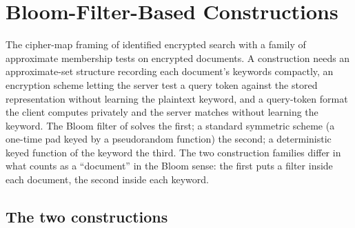 %

\section{Bloom-Filter-Based Constructions}
\label{sec:bloom-based}

The cipher-map framing of  identified
encrypted search with a family of approximate membership tests on
encrypted documents. A construction needs an approximate-set structure
recording each document's keywords compactly, an encryption scheme
letting the server test a query token against the stored representation
without learning the plaintext keyword, and a query-token format the
client computes privately and the server matches without learning the
keyword. The Bloom
filter of  solves the first; a standard symmetric
scheme (a one-time pad keyed by a pseudorandom function) the second; a
deterministic keyed function of the keyword the third. The two
construction families differ in what counts as a ``document'' in the
Bloom sense: the first puts a filter inside each document, the second
inside each keyword.

\subsection*{The two constructions}

